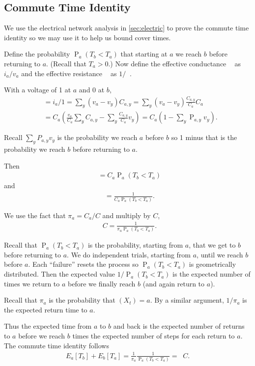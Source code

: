 \documentclass[12pt]{article}
\theoremstyle{definition}
\DeclareMathOperator{\pr}{\mathrm{P}}		     %
\DeclareMathOperator{\Ceff}{C_\textrm{eff}}      %
\DeclareMathOperator{\Reff}{R_{\textrm{eff}}}    %
\begin{document}
\subsection{Commute Time Identity}
We use the electrical network analysis in \cref{sec:electric} to 
prove the commute time identity so we may use it to help us bound
cover times.

Define the probability $\pr_a(T_b < T_a)$ that starting at $a$
we reach $b$ before returning to $a$.
(Recall that $T_a>0$.)
Now define the effective conductance $\Ceff$ as $i_a/v_a$
and the effective resistance $\Reff$ as $1/\Ceff$.

With a voltage of 1 at $a$ and 0 at $b$,
\begin{align}
\Ceff &= i_a/1 =
\sum_y (v_a - v_y) C_{a,y} =
\sum_y (v_a - v_y) \frac{C_{a,y}}{C_a} C_a \nonumber \\
&= C_a (\frac{v_a}{C_a} \sum_y C_{a,y} - \sum_y \frac{C_{a,y}}{C_a} v_y)=
C_a(1-\sum_y\pr_{a,y}v_y).\nonumber
\end{align}

Recall $\sum_y P_{a,y} v_y$ is the probability we reach $a$ before $b$
so 1 minus that is the probability we reach $b$ before returning to $a$.

Then
\begin{align}
\Ceff = C_a \pr_a(T_b < T_a) \nonumber
\end{align}
and
\begin{align}
\Reff = \frac{1}{C_a \pr_a(T_b < T_a)}. \nonumber
\end{align}

We use the fact that $\pi_a = C_a / C$ and multiply by $C$,
\begin{align}
\Reff C = \frac{1}{\pi_a \pr_a(T_b < T_a)}. \nonumber
\end{align}

Recall that $\pr_a(T_b < T_a)$ is the probability, starting from $a$,
that we get to $b$ before returning to $a$.
We do independent trials, starting from $a$, until we reach $b$ before $a$.
Each ``failure'' resets the process so $\pr_a(T_b < T_a)$ is geometrically distributed.
Then the expected value $1/\pr_a(T_b < T_a)$ is the expected number of times
we return to $a$ before we finally reach $b$ (and again return to $a$).

Recall that $\pi_a$ is the probability that $(X_t) = a$.
By a similar argument, $1/\pi_a$ is the expected return time to $a$.

Thus the expected time from $a$ to $b$ and back is
the expected number of returns to $a$ before we reach $b$ times
the expected number of steps for each return to $a$.
The commute time identity follows
\begin{align}
E_a[T_b] + E_b[T_a] = \frac{1}{\pi_a}\frac{1}{\pr_a(T_b < T_a)} = \Reff C.
\label{eqn:commute}
\end{align}
\end{document}
